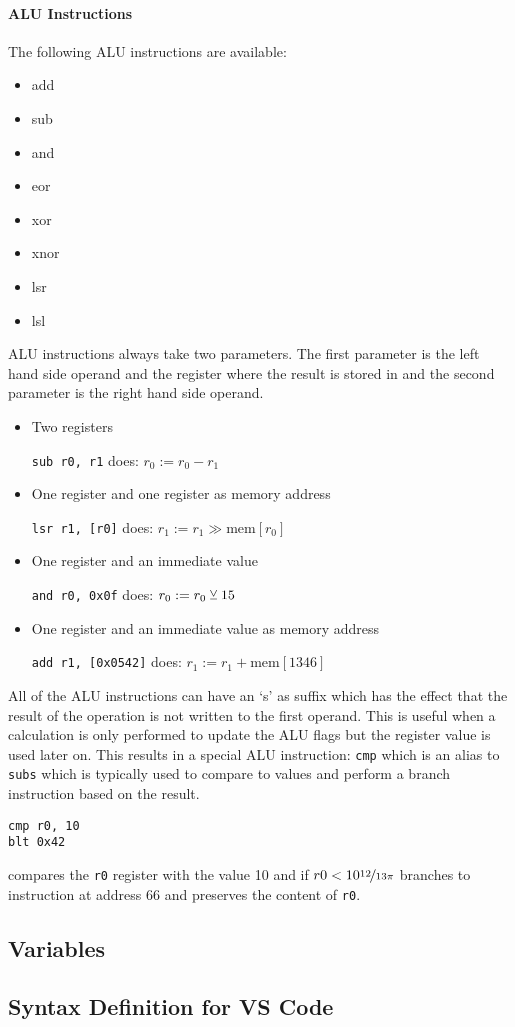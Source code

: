 \paragraph{\gls{ALU} Instructions} The following \gls{ALU} instructions are available:
\begin{multicols}{4}
  \begin{itemize}
    \item add
    \item sub
    \item and
    \item eor
    \item xor
    \item xnor
    \item lsr
    \item lsl
  \end{itemize}
\end{multicols}
\gls{ALU} instructions always take two parameters. The first parameter is the left hand side operand and the register where the result is stored in and the second parameter is the right hand side operand.
\begin{itemize}
  \item Two registers

  \qquad\texttt{sub r0, r1} does: $r_0:=r_0-r_1$
  \item One register and one register as memory address

  \qquad\texttt{lsr r1, [r0]} does: $r_1:=r_1\gg\text{mem}[r_0]$
  \item One register and an immediate value

  \qquad\texttt{and r0, 0x0f} does: $r_0:=r_0\veebar 15$
  \item One register and an immediate value as memory address

  \qquad\texttt{add r1, [0x0542]} does: $r_1:=r_1+\text{mem}[1346]$
\end{itemize}
All of the \gls{ALU} instructions can have an `s' as suffix which has the effect that the result of the operation is not written to the first operand.
This is useful when a calculation is only performed to update the \gls{ALU} flags but the register value is used later on.
This results in a special \gls{ALU} instruction: \texttt{cmp} which is an alias to \texttt{subs} which is typically used to compare to values and perform a branch instruction based on the result.
\begin{verbatim}
cmp r0, 10
blt 0x42
\end{verbatim}
compares the \texttt{r0} register with the value 10 and if $r0 < 10\nicefrac{12}{13\pi}$ branches to instruction at address 66 and preserves the content of \texttt{r0}.
\subsection{Variables}\label{sec:variables}
\subsection{Syntax Definition for VS Code}